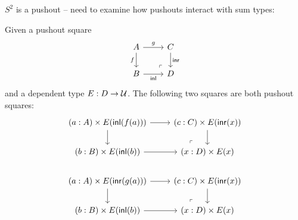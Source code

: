 \documentclass[10pt,oneside,leqno,openright]{memoir}
\begin{document}
$S^2$ is a pushout -- need to examine how pushouts interact with sum types:
\begin{lemma}
  Given a pushout square
\[\begin{tikzcd}[ampersand replacement=\&]
	A \& C \\
	B \& D
	\arrow["g", from=1-1, to=1-2]
	\arrow["f"', from=1-1, to=2-1]
	\arrow["{\mathsf{inr}}", from=1-2, to=2-2]
	\arrow["{\mathsf{inl}}"', from=2-1, to=2-2]
	\arrow["\lrcorner"{anchor=center, pos=0.125, rotate=180}, draw=none, from=2-2, to=1-1]
\end{tikzcd}\]
and a dependent type $E : D \to \mathcal{U}$. The following two squares are both pushout squares:
\[\begin{tikzcd}[ampersand replacement=\&]
	{(a : A)\times E(\mathsf{inl}(f(a)))} \& {(c : C)\times E(\mathsf{inr}(x))} \\
	{(b : B)\times E(\mathsf{inl}(b))} \& {(x : D)\times E(x)} \\
	{(a : A)\times E(\mathsf{inr}(g(a)))} \& {(c : C)\times E(\mathsf{inr}(x))} \\
	{(b : B)\times E(\mathsf{inl}(b))} \& {(x : D)\times E(x)}
	\arrow[""{name=0, anchor=center, inner sep=0}, from=1-1, to=1-2]
	\arrow[from=1-1, to=2-1]
	\arrow[from=1-2, to=2-2]
	\arrow[from=2-1, to=2-2]
	\arrow[""{name=1, anchor=center, inner sep=0}, from=3-1, to=3-2]
	\arrow[from=3-1, to=4-1]
	\arrow[from=3-2, to=4-2]
	\arrow[from=4-1, to=4-2]
	\arrow["\lrcorner"{anchor=center, pos=0.125, rotate=180}, draw=none, from=2-2, to=0]
	\arrow["\lrcorner"{anchor=center, pos=0.125, rotate=180}, draw=none, from=4-2, to=1]
\end{tikzcd}\]
\end{lemma}

\end{document}
